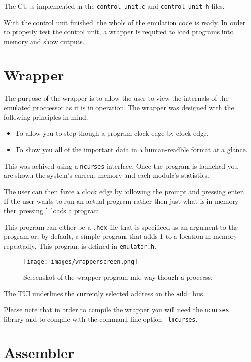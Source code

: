 \documentclass[a4paper]{article}
\begin{document}
The CU is implemented in the \verb|control_unit.c| and \verb|control_unit.h| files.

With the control unit finished, the whole of the emulation code is ready. In order to properly test the control unit, a wrapper is required to load programs into memory and show outputs.

\section{Wrapper}

The purpose of the wrapper is to allow the user to view the internals of the emulated proccessor as it is in operation. The wrapper was designed with the following principles in mind.

\begin{itemize}
    \item To allow you to step though a program clock-edge by clock-edge.
    \item To show you all of the important data in a human-readble format at a glance.
\end{itemize}

This was achived using a \verb|ncurses| interface. Once the program is launched you are shown the system's current memory and each module's statistics.

The user can then force a clock edge by following the prompt and pressing enter. If the user wants to run an actual program rather then just what is in memory then pressing \verb|l| loads a program. 

This program can either be a \verb|.hex| file that is specificed as an argument to the program or, by default, a simple program that adds 1 to a location in memory repeatadly. This program is defined in \verb|emulator.h|.

\begin{figure}[H]
\centering
\texttt{[image: images/wrapperscreen.png]}
\caption{Screenshot of the wrapper program mid-way though a proccess.}
\end{figure}

The TUI underlines the currently selected address on the \verb|addr| bus.

Please note that in order to compile the wrapper you will need the \verb|ncurses| library and to compile with the command-line option \verb|-lncurses|.

\section{Assembler}
\end{document}
